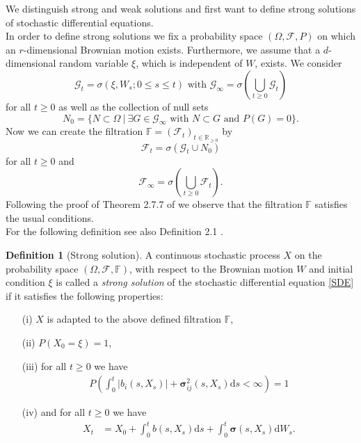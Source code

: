 \documentclass[11pt,titlepage]{article}
\newcommand{\R}{\mathbb{R}} %
\newcommand{\abs}[1]{{\left| #1 \right|}}
\theoremstyle{definition}
\newtheorem{definition}[theorem]{Definition}
\theoremstyle{remark}
\begin{document}
	We distinguish strong and weak solutions and first want to define strong solutions of stochastic differential equations. \\
	In order to define strong solutions we fix a probability space $(\Omega, \mathcal{F}, P)$ on which an $r$-dimensional Brownian motion exists. Furthermore, we assume that a $d$-dimensional 
	random variable $\xi$, which is independent of $W$, exists. 
	We consider
	\[\mathcal{G}_t = \sigma(\xi, W_s; 0\leq s\leq t) \text{ with } \mathcal{G}_\infty = \sigma\left(\bigcup_{t\geq 0}\mathcal{G}_t\right)\]
	for all $t\geq 0$ as well as the collection of null sets
	\[N_0 = \{ N \subset \Omega\ \vert\ \exists G\in \mathcal{G}_\infty \text{ with } N\subset G\text{ and } P(G)=0\}.\]
	Now we can create the filtration $\mathbb{F} = (\mathcal{F}_t)_{t\in\R_{\geq 0}}$ by
	\[\mathcal{F}_t = \sigma(\mathcal{G}_t \cup N_0)\]
	for all $t\geq 0$ and
	\[\mathcal{F}_\infty = \sigma\left(\bigcup_{t\geq 0}\mathcal{F}_t\right).\]
	Following the proof of Theorem 2.7.7 of \cite{Karatzas2012} we observe that the filtration $\mathbb{F}$ 
	satisfies the usual conditions. \\
	For the following definition see also Definition 2.1 \cite{Karatzas2012}.
	
	\begin{definition}[Strong solution] \label{SDE strong solution}
		A continuous stochastic process $X$ on the probability space $(\Omega, \mathcal{F},\mathbb{F})$, 
		with respect to the Brownian motion $W$ and initial condition $\xi$ is called a \textsl{strong solution}
		of the stochastic differential equation \ref{SDE} if it satisfies the following properties:
		\begin{itemize}
			\item[(i)] $X$ is adapted to the above defined filtration $\mathbb{F}$,
			\item[(ii)] $P(X_0 = \xi)=1$, 
			\item[(iii)] for all $t\geq 0$ we have
			\begin{align*}
				P\left(\int_0^t \abs{b_i(s, X_s)} +\boldsymbol{\sigma}_{ij}^2(s, X_s) \mathrm{d}s<\infty\right)=1
			\end{align*}
			\item[(iv)] and for all $t\geq 0$ we have
			\begin{align*}
				X_t &= X_0 + \int_0^t b(s, X_s)\mathrm{d}s + \int_0^t \boldsymbol{\sigma}(s,X_s)\mathrm{d}W_s.
			\end{align*}
		\end{itemize}
	\end{definition} 
\end{document}
